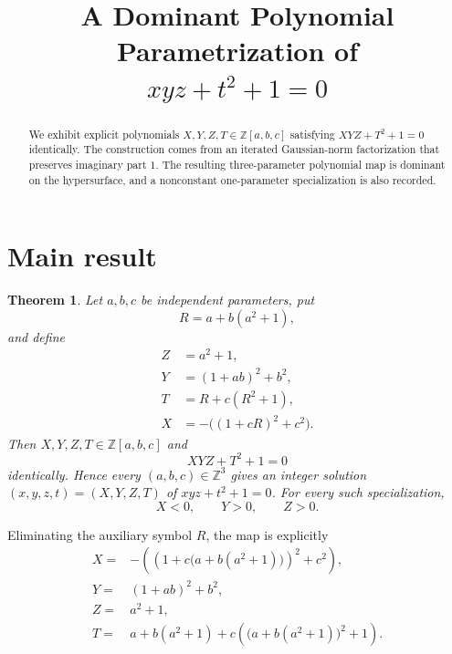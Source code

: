 \documentclass[11pt]{article}
\title{A Dominant Polynomial Parametrization of\\
\texorpdfstring{$xyz+t^2+1=0$}{xyz+t^2+1=0}}
\author{}
\date{}
\newtheorem{theorem}{Theorem}[section]
\theoremstyle{remark}
\newcommand{\Z}{\mathbb Z}
\begin{document}
\maketitle
\vspace{-2.2em}

\begin{abstract}
We exhibit explicit polynomials $X,Y,Z,T\in\Z[a,b,c]$ satisfying
$XYZ+T^2+1=0$ identically.  The construction comes from an iterated
Gaussian-norm factorization that preserves imaginary part $1$.  The
resulting three-parameter polynomial map is dominant on the
hypersurface, and a nonconstant one-parameter specialization is also
recorded.
\end{abstract}

\section{Main result}

\begin{theorem}\label{thm:main}
Let $a,b,c$ be independent parameters, put
\begin{equation}\label{eq:R-def}
R=a+b(a^2+1),
\end{equation}
and define
\begin{equation}\label{eq:parametrization}
\boxed{
\begin{aligned}
Z&=a^2+1,\\
Y&=(1+ab)^2+b^2,\\
T&=R+c(R^2+1),\\
X&=-\bigl((1+cR)^2+c^2\bigr).
\end{aligned}}
\end{equation}
Then $X,Y,Z,T\in\Z[a,b,c]$ and
\begin{equation}\label{eq:main-identity}
XYZ+T^2+1=0
\end{equation}
identically.  Hence every $(a,b,c)\in\Z^3$ gives an integer solution
$(x,y,z,t)=(X,Y,Z,T)$ of $xyz+t^2+1=0$.  For every such specialization,
\[
X<0,\qquad Y>0,\qquad Z>0.
\]
\end{theorem}

Eliminating the auxiliary symbol $R$, the map is explicitly
\begin{equation}\label{eq:expanded-parametrization}
\begin{aligned}
X={}&-\left(\left(1+c\bigl(a+b(a^2+1)\bigr)\right)^2+c^2\right),\\
Y={}&(1+ab)^2+b^2,\\
Z={}&a^2+1,\\
T={}&a+b(a^2+1)
+c\left(\bigl(a+b(a^2+1)\bigr)^2+1\right).
\end{aligned}
\end{equation}
\end{document}
